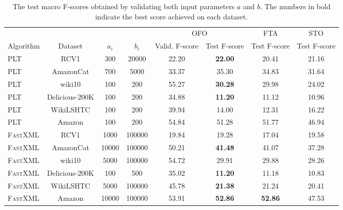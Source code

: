 \documentclass{article}
\newcommand{\Algo}[1]{\textsc{#1}}
\begin{document}
\begin{table}[ht!] 
	\caption{The test macro F-scores obtained by validating both input parameters $a$ and $b$. The numbers in bold indicate the best score achieved on each dataset.} 
	\label{tab:ofo_a_b}
	\begin{center}
		\begin{small}
			\begin{tabular}{l@{\hskip 3pt}| c@{\hskip 4pt} c@{\hskip 4pt} c@{\hskip 4pt} | c@{\hskip 4pt} c@{\hskip 4pt}  | c@{\hskip 4pt} | c@{\hskip 4pt}  }
				\toprule
		  &         &       &       &  \multicolumn{2}{c|}{\Algo{OFO}} & \Algo{FTA} & \Algo{STO} \\           	
Algorithm & Dataset & $a_i$ & $b_i$ & Valid. F-score & Test F-score & Test F-score & Test F-score  \\
\midrule
\Algo{PLT} & RCV1 & 300 & 20000 & 22.20 & { \bf 22.00 } & 20.41 & 21.16 \\
\Algo{PLT} & AmazonCat & 700 & 5000 & 33.37 & 35.30 & 34.83 & 31.64 \\
\Algo{PLT} & wiki10 & 100 & 200 & 55.27 & { \bf 30.28 } & 29.98 & 24.02 \\
\Algo{PLT} & Delicious-200K & 100 & 200 & 34.88 & {\bf 11.20} & 11.12 & 10.96 \\
\Algo{PLT} & WikiLSHTC & 100 & 200 & 39.94 & 14.00 & 12.31 & 16.22 \\
\Algo{PLT} & Amazon & 100 & 200 & 54.84 & 51.28 & 51.77 & 46.94 \\
\midrule
\Algo{FastXML} & RCV1 & 1000 & 100000 & 19.84 & 19.28 & 17.04 & 19.58 \\
\Algo{FastXML} & AmazonCat & 10000 & 100000 & 50.21 & { \bf 41.48 } & 41.07 & 37.28 \\
\Algo{FastXML} & wiki10 & 5000 & 100000 & 54.72 & 29.91 & 29.88 & 28.26 \\
\Algo{FastXML} & Delicious-200K & 100 & 500 & 35.02 & { \bf 11.20 } & 11.18 & 10.83 \\
\Algo{FastXML} & WikiLSHTC & 5000 & 100000 & 45.78 & { \bf 21.38 } & 21.24 & 20.41 \\
\Algo{FastXML} & Amazon & 10000 & 100000 & 53.91 & {\bf 52.86} & {\bf 52.86} & 47.53 \\
				\bottomrule
			\end{tabular}
		\end{small}
	\end{center}
\end{table}
\end{document}
